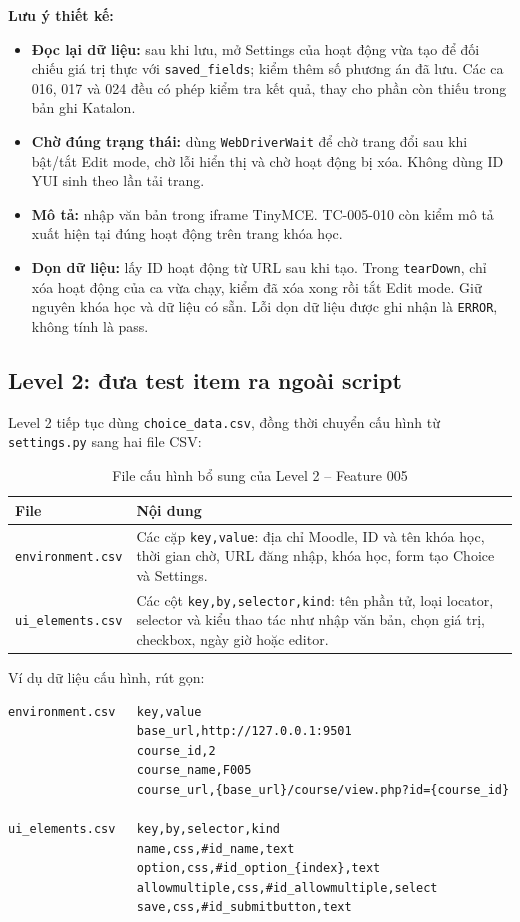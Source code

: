 \documentclass[12pt,a4paper]{article}
\begin{document}
\noindent\textbf{Lưu ý thiết kế:}
\begin{itemize}[noitemsep]
  \item \textbf{Đọc lại dữ liệu:} sau khi lưu, mở Settings của hoạt động vừa tạo để đối chiếu
        giá trị thực với \texttt{saved\_fields}; kiểm thêm số phương án đã lưu. Các ca 016, 017 và 024
        đều có phép kiểm tra kết quả, thay cho phần còn thiếu trong bản ghi Katalon.
  \item \textbf{Chờ đúng trạng thái:} dùng \texttt{WebDriverWait} để chờ trang đổi sau khi bật/tắt Edit mode,
        chờ lỗi hiển thị và chờ hoạt động bị xóa. Không dùng ID YUI sinh theo lần tải trang.
  \item \textbf{Mô tả:} nhập văn bản trong iframe TinyMCE. TC-005-010 còn kiểm mô tả xuất hiện
        tại đúng hoạt động trên trang khóa học.
  \item \textbf{Dọn dữ liệu:} lấy ID hoạt động từ URL sau khi tạo. Trong \texttt{tearDown}, chỉ xóa
        hoạt động của ca vừa chạy, kiểm đã xóa xong rồi tắt Edit mode. Giữ nguyên khóa học và dữ liệu có sẵn.
        Lỗi dọn dữ liệu được ghi nhận là \texttt{ERROR}, không tính là pass.
\end{itemize}

\subsection{Level 2: đưa test item ra ngoài script}
Level 2 tiếp tục dùng \texttt{choice\_data.csv}, đồng thời chuyển cấu hình từ
\texttt{settings.py} sang hai file CSV:

\begin{table}[H]
\centering\small
\begin{tabular}{|L{4.2cm}|L{9.9cm}|}
\hline
{}\textbf{File} & \textbf{Nội dung} \\ \hline
\texttt{environment.csv} & Các cặp \texttt{key,value}: địa chỉ Moodle, ID và tên khóa học,
thời gian chờ, URL đăng nhập, khóa học, form tạo Choice và Settings. \\ \hline
\texttt{ui\_elements.csv} & Các cột \texttt{key,by,selector,kind}: tên phần tử, loại locator,
selector và kiểu thao tác như nhập văn bản, chọn giá trị, checkbox, ngày giờ hoặc editor. \\ \hline
\end{tabular}
\caption{File cấu hình bổ sung của Level 2 -- Feature 005}
\end{table}

Ví dụ dữ liệu cấu hình, rút gọn:
\begin{lstlisting}
environment.csv   key,value
                  base_url,http://127.0.0.1:9501
                  course_id,2
                  course_name,F005
                  course_url,{base_url}/course/view.php?id={course_id}

ui_elements.csv   key,by,selector,kind
                  name,css,#id_name,text
                  option,css,#id_option_{index},text
                  allowmultiple,css,#id_allowmultiple,select
                  save,css,#id_submitbutton,text
\end{lstlisting}
\end{document}
